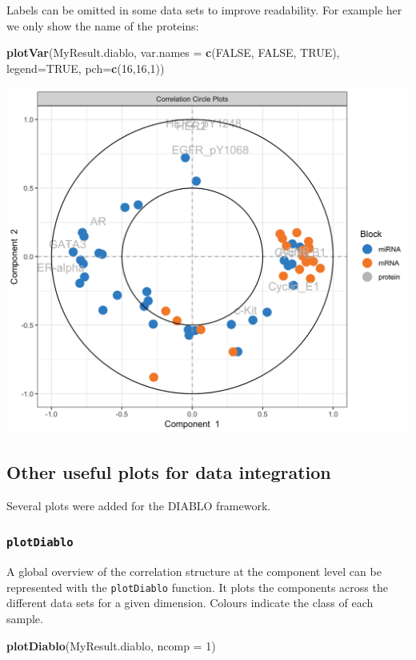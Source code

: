 \documentclass[]{book}
\newenvironment{Shaded}{\begin{snugshade}}{\end{snugshade}}
\newcommand{\KeywordTok}[1]{\textcolor[rgb]{0.13,0.29,0.53}{\textbf{#1}}}
\newcommand{\DataTypeTok}[1]{\textcolor[rgb]{0.13,0.29,0.53}{#1}}
\newcommand{\DecValTok}[1]{\textcolor[rgb]{0.00,0.00,0.81}{#1}}
\newcommand{\OtherTok}[1]{\textcolor[rgb]{0.56,0.35,0.01}{#1}}
\newcommand{\NormalTok}[1]{#1}
\theoremstyle{definition}
\theoremstyle{definition}
\theoremstyle{definition}
\theoremstyle{remark}
\begin{document}
Labels can be omitted in some data sets to improve readability. For
example her we only show the name of the proteins:

\begin{Shaded}
\begin{Highlighting}[]
\KeywordTok{plotVar}\NormalTok{(MyResult.diablo, }\DataTypeTok{var.names =} \KeywordTok{c}\NormalTok{(}\OtherTok{FALSE}\NormalTok{, }\OtherTok{FALSE}\NormalTok{, }\OtherTok{TRUE}\NormalTok{),}
        \DataTypeTok{legend=}\OtherTok{TRUE}\NormalTok{, }\DataTypeTok{pch=}\KeywordTok{c}\NormalTok{(}\DecValTok{16}\NormalTok{,}\DecValTok{16}\NormalTok{,}\DecValTok{1}\NormalTok{))}
\end{Highlighting}
\end{Shaded}

\begin{center}\includegraphics[width=0.5\linewidth]{Figures/unnamed-chunk-5-1} \end{center}

\subsection{Other useful plots for data
integration}\label{other-useful-plots-for-data-integration-1}

Several plots were added for the DIABLO framework.

\subsubsection{\texorpdfstring{\texttt{plotDiablo}}{plotDiablo}}\label{plotdiablo}

A global overview of the correlation structure at the component level
can be represented with the \texttt{plotDiablo} function. It plots the
components across the different data sets for a given dimension. Colours
indicate the class of each sample.

\begin{Shaded}
\begin{Highlighting}[]
\KeywordTok{plotDiablo}\NormalTok{(MyResult.diablo, }\DataTypeTok{ncomp =} \DecValTok{1}\NormalTok{)}
\end{Highlighting}
\end{Shaded}
\end{document}
